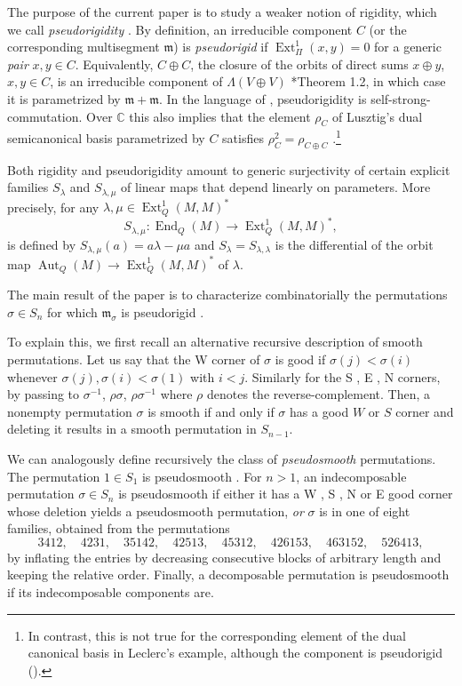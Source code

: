 \documentclass[12pt]{article}
\def\xspace{ }%
\theoremstyle{definition}
\newcommand{\prig}{pseudorigid\xspace}
\newcommand{\prigity}{pseudorigidity\xspace}
\newcommand{\psm}{pseudosmooth\xspace}
\newcommand{\good}{good\xspace}
\newcommand{\CC}{\mathbb{C}}
\newcommand{\Ext}{\operatorname{Ext}}
\newcommand{\End}{\operatorname{End}}
\newcommand{\Aut}{\operatorname{Aut}}
\newcommand{\cmp}{C}                       %
\newcommand{\mm}{\mathfrak{m}}
\newcommand{\Sop}{S}
\newcommand{\wo}{w_0}                 %
\newcommand{\rc}{\rho}                %
\newcommand{\Wcr}{W\xspace}    %
\newcommand{\Ncr}{N\xspace}    %
\newcommand{\Scr}{S\xspace}    %
\newcommand{\Ecr}{E\xspace}    %
\begin{document}
The purpose of the current paper is to study a weaker notion of rigidity, which we call \emph{\prigity}.
By definition, an irreducible component $\cmp$ (or the corresponding multisegment $\mm$) is \emph{\prig} if $\Ext^1_\Pi(x,y) = 0$ for a generic \emph{pair} $x,y\in\cmp$.
Equivalently, $\cmp\oplus\cmp$, the closure of the orbits of direct sums $x\oplus y$, $x,y\in\cmp$, is an irreducible component of $\Lambda(V\oplus V)$ \cite{MR1944812}*{Theorem 1.2},
in which case it is parametrized by $\mm+\mm$.
In the language of \cite{MR4847234}, \prigity is self-strong-commutation.
Over $\CC$ this also implies that the element $\rho_{\cmp}$ of Lusztig's dual semicanonical basis parametrized by $\cmp$ satisfies $\rho_{\cmp}^2=\rho_{\cmp\oplus\cmp}$ \cite{MR2144987}.\footnote{In contrast, this is not true for the corresponding element of the dual canonical basis in Leclerc's example, although the component is \prig ().}


Both rigidity and \prigity amount to generic surjectivity of certain explicit families $\Sop_\lambda$ and $\Sop_{\lambda,\mu}$ of linear maps that depend linearly on parameters.
More precisely, for any $\lambda,\mu\in\Ext^1_Q(M,M)^*$
\[
\Sop_{\lambda,\mu} : \End_Q(M)\to \Ext^1_Q(M,M)^* ,
\]
is defined by $\Sop_{\lambda,\mu}(a) = a\lambda - \mu a$ and $\Sop_\lambda=\Sop_{\lambda,\lambda}$ is the differential of the orbit map
$\Aut_Q(M)\to \Ext^1_Q(M,M)^*$ of $\lambda$.

The main result of the paper is to characterize combinatorially the permutations $\sigma\in S_n$ for which $\mm_\sigma$ is \prig.

To explain this, we first recall an alternative recursive description of smooth permutations.
Let us say that the \Wcr corner of $\sigma$ is \good if $\sigma(j)<\sigma(i)$ whenever $\sigma(j),\sigma(i)<\sigma(1)$ with $i<j$.
Similarly for the \Scr, \Ecr, \Ncr corners, by passing to $\sigma^{-1}$, $\rc\sigma$, $\rc\sigma^{-1}$ where $\rc$ denotes the reverse-complement.
Then, a nonempty permutation $\sigma$ is smooth if and only if $\sigma$ has a \good $\Wcr$ or $\Scr$ corner and deleting it results in a smooth permutation in $S_{n-1}$.

We can analogously define recursively the class of \emph{\psm} permutations.
The permutation $1\in S_1$ is \psm.
For $n>1$, an indecomposable permutation $\sigma\in S_n$ is \psm if either it has a \Wcr, \Scr, \Ncr or \Ecr \good corner whose deletion yields a \psm permutation, \emph{or} $\sigma$ is in one of eight families, obtained from the permutations
\begin{equation} \label{eq:8quot}
   3412,\quad 4231,\quad 35142,\quad 42513,\quad 45312,\quad 426153,\quad 463152,\quad 526413,
\end{equation}
by inflating the entries by decreasing consecutive blocks of arbitrary length and keeping the relative order.
Finally, a decomposable permutation is \psm if its indecomposable components are.
\end{document}
